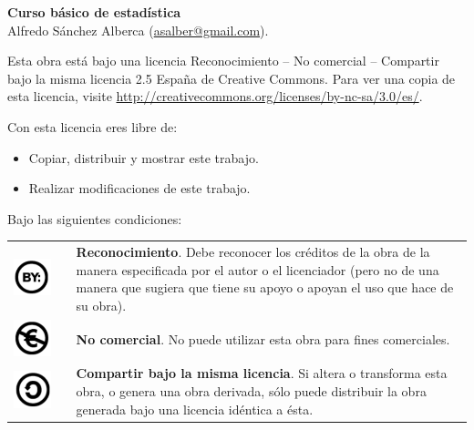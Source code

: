\sffamily
\small
\noindent \textbf{Curso básico de estadística}\\
Alfredo Sánchez Alberca (\url{asalber@gmail.com}).
\smallskip

\scriptsize
Esta obra está bajo una licencia Reconocimiento -- No comercial -- Compartir bajo la misma licencia 2.5 España de Creative Commons.
Para ver una copia de esta licencia, visite \url{http://creativecommons.org/licenses/by-nc-sa/3.0/es/}.

\medskip
Con esta licencia eres libre de:
\begin{itemize}
\item Copiar, distribuir y mostrar este trabajo.
\item Realizar modificaciones de este trabajo.
\end{itemize}

Bajo las siguientes condiciones:
\begin{center}
\begin{tabular}{ccp{10cm}}
\includegraphics[scale=0.15]{img/cc-by} & \quad & \textbf{Reconocimiento}. Debe reconocer los créditos de la obra de la
manera especificada por el autor o el licenciador (pero no de una manera que sugiera que tiene su apoyo o apoyan el uso que hace de su obra).\\ 
\includegraphics[scale=0.15]{img/cc-e} & \quad & \textbf{No comercial}. No puede utilizar esta obra para fines
comerciales.\\ \includegraphics[scale=0.15]{img/cc-c} & \quad & \textbf{Compartir bajo la misma licencia}. Si altera o transforma esta
obra, o genera una obra derivada, sólo puede distribuir la obra generada bajo una licencia idéntica a ésta.
\end{tabular}
\end{center}

